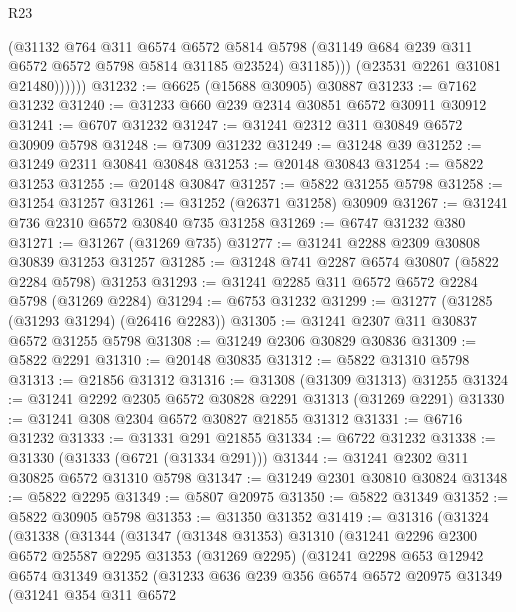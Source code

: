\begin{lexlean}{R23}
\begin{coremodule}
                  (@31132
                    @764
                    @311
                    @6574
                    @6572
                    @5814
                    @5798
                    (@31149 @684 @239 @311 @6572 @6572 @5798 @5814 @31185 @23524)
                    @31185)))
              (@23531 @2261 @31081 @21480))))))
@31232 := @6625 (@15688 @30905) @30887
@31233 := @7162 @31232
@31240 := @31233 @660 @239 @2314 @30851 @6572 @30911 @30912
@31241 := @6707 @31232
@31247 := @31241 @2312 @311 @30849 @6572 @30909 @5798
@31248 := @7309 @31232
@31249 := @31248 @39
@31252 := @31249 @2311 @30841 @30848
@31253 := @20148 @30843
@31254 := @5822 @31253
@31255 := @20148 @30847
@31257 := @5822 @31255 @5798
@31258 := @31254 @31257
@31261 := @31252 (@26371 @31258) @30909
@31267 := @31241 @736 @2310 @6572 @30840 @735 @31258
@31269 := @6747 @31232 @380
@31271 := @31267 (@31269 @735)
@31277 := @31241 @2288 @2309 @30808 @30839 @31253 @31257
@31285 := @31248 @741 @2287 @6574 @30807 (@5822 @2284 @5798) @31253
@31293 := @31241 @2285 @311 @6572 @6572 @2284 @5798 (@31269 @2284)
@31294 := @6753 @31232
@31299 := @31277 (@31285 (@31293 @31294) (@26416 @2283))
@31305 := @31241 @2307 @311 @30837 @6572 @31255 @5798
@31308 := @31249 @2306 @30829 @30836
@31309 := @5822 @2291
@31310 := @20148 @30835
@31312 := @5822 @31310 @5798
@31313 := @21856 @31312
@31316 := @31308 (@31309 @31313) @31255
@31324 := @31241 @2292 @2305 @6572 @30828 @2291 @31313 (@31269 @2291)
@31330 := @31241 @308 @2304 @6572 @30827 @21855 @31312
@31331 := @6716 @31232
@31333 := @31331 @291 @21855
@31334 := @6722 @31232
@31338 := @31330 (@31333 (@6721 (@31334 @291)))
@31344 := @31241 @2302 @311 @30825 @6572 @31310 @5798
@31347 := @31249 @2301 @30810 @30824
@31348 := @5822 @2295
@31349 := @5807 @20975
@31350 := @5822 @31349
@31352 := @5822 @30905 @5798
@31353 := @31350 @31352
@31419 := @31316
    (@31324
      (@31338
        (@31344
          (@31347
            (@31348 @31353)
            @31310
            (@31241
              @2296
              @2300
              @6572
              @25587
              @2295
              @31353
              (@31269 @2295)
              (@31241
                @2298
                @653
                @12942
                @6574
                @31349
                @31352
                (@31233
                  @636
                  @239
                  @356
                  @6574
                  @6572
                  @20975
                  @31349
                  (@31241
                    @354
                    @311
                    @6572

\end{coremodule}
\end{lexlean}

